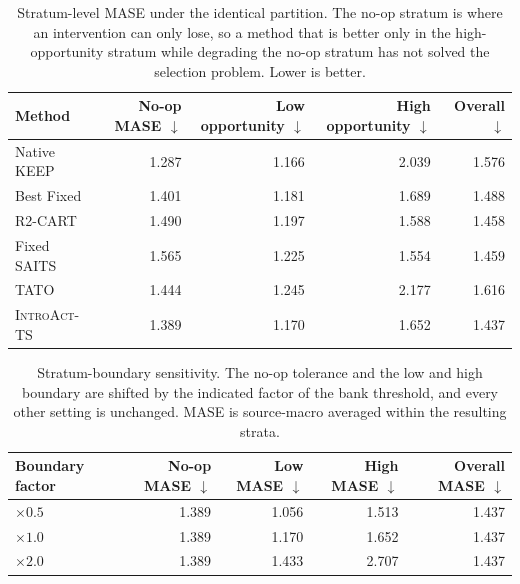 \documentclass{article}
\newcommand{\introact}{\textsc{IntroAct-TS}}
\begin{document}
\begin{table}[htbp]
  \caption{Stratum-level MASE under the identical partition. The no-op stratum is where an
  intervention can only lose, so a method that is better only in the high-opportunity stratum
  while degrading the no-op stratum has not solved the selection problem. Lower is better.}
  \label{tab:app-opportunity}
  \centering
  \small
  \setlength{\tabcolsep}{4pt}
\begin{tabular*}{\textwidth}{@{\extracolsep{\fill}}lrrrr@{}}
    \toprule
    Method & No-op MASE $\downarrow$ & Low opportunity $\downarrow$ & High opportunity $\downarrow$ & Overall $\downarrow$ \\
    \midrule
    Native KEEP        & 1.287    & 1.166    & 2.039    & 1.576 \\
    Best Fixed         & 1.401      & 1.181      & 1.689      & 1.488 \\
    R2-CART            & 1.490      & 1.197      & 1.588      & 1.458 \\
    Fixed SAITS           & 1.565      & 1.225      & 1.554      & 1.459 \\
    TATO               & 1.444    & 1.245    & 2.177    & 1.616 \\
    \midrule
    \rowcolor{bestgray}\introact{} & 1.389 & 1.170 & 1.652 & 1.437 \\
    \bottomrule
  \end{tabular*}
\end{table}

\begin{table}[htbp]
  \caption{Stratum-boundary sensitivity. The no-op tolerance and the low and high boundary are
  shifted by the indicated factor of the bank threshold, and every other setting is unchanged.
  MASE is source-macro averaged within the resulting strata.}
  \label{tab:app-opp-sens}
  \centering
  \small
  \setlength{\tabcolsep}{4pt}
\begin{tabular*}{\textwidth}{@{\extracolsep{\fill}}lrrrr@{}}
    \toprule
    Boundary factor & No-op MASE $\downarrow$ & Low MASE $\downarrow$ & High MASE $\downarrow$ & Overall MASE $\downarrow$ \\
    \midrule
    $\times 0.5$ & 1.389  & 1.056  & 1.513  & 1.437 \\
    $\times 1.0$ & 1.389   & 1.170   & 1.652   & 1.437 \\
    $\times 2.0$ & 1.389   & 1.433   & 2.707   & 1.437 \\
    \bottomrule
  \end{tabular*}
\end{table}
\end{document}
